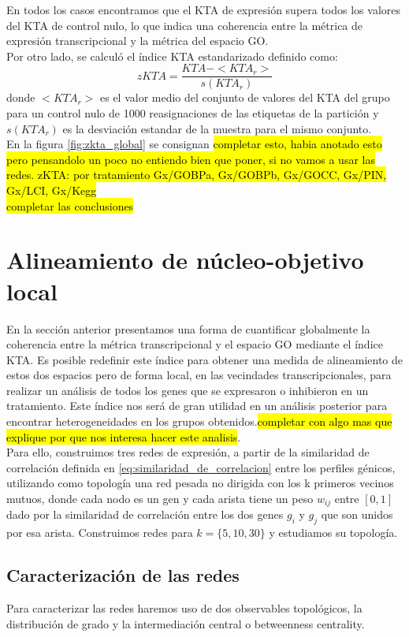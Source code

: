 En todos los casos encontramos que el KTA de expresión supera todos los valores del KTA de control nulo, lo que indica una coherencia entre la métrica de expresión transcripcional y la métrica del espacio GO.\\
Por otro lado, se calculó el índice KTA estandarizado definido como:
\begin{equation}
	zKTA = \frac{KTA-<KTA_r>}{s(KTA_r)}
\end{equation}
donde $<KTA_r>$ es el valor medio del conjunto de valores del KTA del grupo para un control nulo de 1000 reasignaciones de las etiquetas de la partición y $s(KTA_r)$ es la desviación estandar de la muestra para el mismo conjunto.\\
En la figura \ref{fig:zkta_global} se consignan \hl{completar esto, habia anotado esto pero pensandolo un poco no entiendo bien que poner, si no vamos a usar las redes. zKTA: por tratamiento Gx/GOBPa, Gx/GOBPb, Gx/GOCC, Gx/PIN, Gx/LCI, Gx/Kegg}\\
\hl{completar las conclusiones}
\section{Alineamiento de núcleo-objetivo local}
En la sección anterior presentamos una forma de cuantificar globalmente la coherencia entre la métrica transcripcional y el espacio GO mediante el índice KTA. Es posible redefinir este índice para obtener una medida de alineamiento de estos dos espacios pero de forma local, en las vecindades transcripcionales, para realizar un análisis de todos los genes que se expresaron o inhibieron en un tratamiento. Este índice nos será de gran utilidad en un análisis posterior para encontrar heterogeneidades en los grupos obtenidos.\hl{completar con algo mas que explique por que nos interesa hacer este analisis}.\\
Para ello, construimos tres redes de expresión, a partir de la similaridad de correlación definida en \ref{eq:similaridad_de_correlacion} entre los perfiles génicos, utilizando como topología una red pesada no dirigida con los k primeros vecinos mutuos, donde cada nodo es un gen y cada arista tiene un peso $w_{ij}$ entre $[0, 1]$ dado por la similaridad de correlación entre los dos genes $g_i$ y $g_j$ que son unidos por esa arista. Construimos redes para $k=\{5, 10, 30\}$ y estudiamos su topología.\\
\subsection{Caracterización de las redes}
Para caracterizar las redes haremos uso de dos observables topológicos, la distribución de grado y la intermediación central o betweenness centrality.\\
